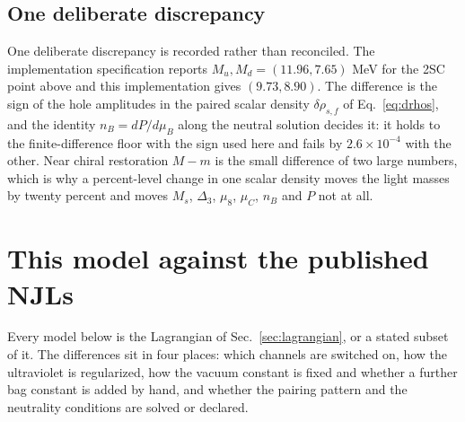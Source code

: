 \documentclass[aps,prc,onecolumn,superscriptaddress,nofootinbib,10pt]{revtex4-2}
\newcommand{\nB}{n_B}
\newcommand{\muB}{\mu_B}
\newcommand{\muC}{\mu_C}
\begin{document}
\subsection{One deliberate discrepancy}

One deliberate discrepancy is recorded rather than reconciled. The
implementation specification reports $M_u, M_d = (11.96, 7.65)$ MeV for the
2SC point above and this implementation gives $(9.73, 8.90)$. The difference is
the sign of the hole amplitudes in the paired scalar density $\delta\rho_{s,f}$
of Eq.~\eqref{eq:drhos}, and the identity $\nB = dP/d\muB$ along the neutral
solution decides it: it holds to the finite-difference floor with the sign used
here and fails by $2.6\times10^{-4}$ with the other. Near chiral restoration
$M-m$ is the small difference of two large numbers, which is why a
percent-level change in one scalar density moves the light masses by twenty
percent and moves $M_s$, $\Delta_3$, $\mu_8$, $\muC$, $\nB$ and $P$ not at all.

\section{This model against the published NJLs}
\label{sec:literature}

Every model below is the Lagrangian of Sec.~\ref{sec:lagrangian}, or a stated
subset of it. The differences sit in four places: which channels are switched
on, how the ultraviolet is regularized, how the vacuum constant is fixed and
whether a further bag constant is added by hand, and whether the pairing
pattern and the neutrality conditions are solved or declared.
\end{document}
